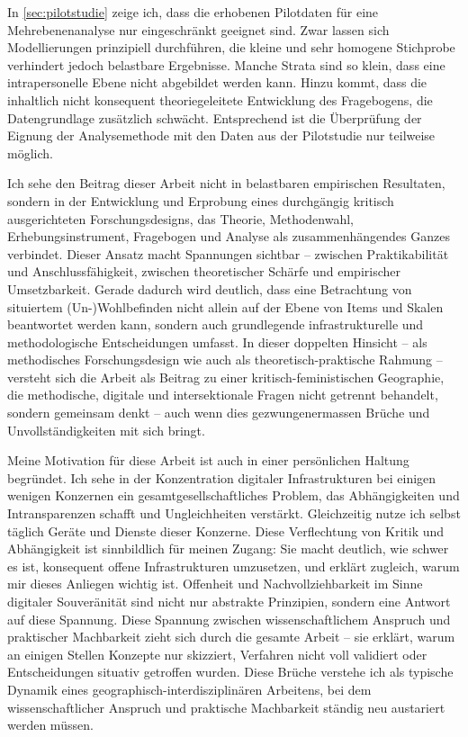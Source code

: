 In \cref{sec:pilotstudie} zeige ich, dass die erhobenen Pilotdaten für eine  Mehrebenenanalyse nur eingeschränkt geeignet sind. Zwar lassen sich Modellierungen prinzipiell durchführen, die kleine und sehr homogene Stichprobe verhindert jedoch belastbare Ergebnisse. Manche Strata sind so klein, dass eine intrapersonelle Ebene nicht abgebildet werden kann. Hinzu kommt, dass die inhaltlich nicht konsequent theoriegeleitete Entwicklung des Fragebogens, die Datengrundlage zusätzlich schwächt. Entsprechend ist die Überprüfung der Eignung der Analysemethode mit den Daten aus der Pilotstudie nur teilweise möglich.

Ich sehe den Beitrag dieser Arbeit nicht in belastbaren empirischen Resultaten, sondern in der Entwicklung und Erprobung eines durchgängig kritisch ausgerichteten Forschungsdesigns, das Theorie, Methodenwahl, Erhebungsinstrument, Fragebogen und Analyse als zusammenhängendes Ganzes verbindet. Dieser Ansatz macht Spannungen sichtbar -- zwischen Praktikabilität und Anschlussfähigkeit, zwischen theoretischer Schärfe und empirischer Umsetzbarkeit. Gerade dadurch wird deutlich, dass eine  Betrachtung von situiertem (Un\nobreakdash-)Wohlbefinden nicht allein auf der Ebene von Items und Skalen beantwortet werden kann, sondern auch grundlegende infrastrukturelle und methodologische Entscheidungen umfasst. In dieser doppelten Hinsicht -- als methodisches Forschungsdesign wie auch als theoretisch-praktische Rahmung -- versteht sich die Arbeit als Beitrag zu einer kritisch-feministischen Geographie, die methodische, digitale und intersektionale Fragen nicht getrennt behandelt, sondern gemeinsam denkt -- auch wenn dies gezwungenermassen Brüche und Unvollständigkeiten mit sich bringt.

Meine Motivation für diese Arbeit ist auch in einer persönlichen Haltung begründet. Ich sehe in der Konzentration digitaler Infrastrukturen bei einigen wenigen Konzernen ein gesamtgesellschaftliches Problem, das Abhängigkeiten und Intransparenzen schafft und Ungleichheiten verstärkt. Gleichzeitig nutze ich selbst täglich Geräte und Dienste dieser Konzerne. Diese Verflechtung von Kritik und Abhängigkeit ist sinnbildlich für meinen Zugang: Sie macht deutlich, wie schwer es ist, konsequent offene Infrastrukturen umzusetzen, und erklärt zugleich, warum mir dieses Anliegen wichtig ist. Offenheit und Nachvollziehbarkeit im Sinne digitaler Souveränität sind nicht nur abstrakte Prinzipien, sondern eine Antwort auf diese Spannung. Diese Spannung zwischen wissenschaftlichem Anspruch und praktischer Machbarkeit zieht sich durch die gesamte Arbeit -- sie erklärt, warum an einigen Stellen Konzepte nur skizziert, Verfahren nicht voll validiert oder Entscheidungen situativ getroffen wurden. Diese Brüche verstehe ich als typische Dynamik eines geographisch-interdisziplinären Arbeitens, bei dem wissenschaftlicher Anspruch und praktische Machbarkeit ständig neu austariert werden müssen.

